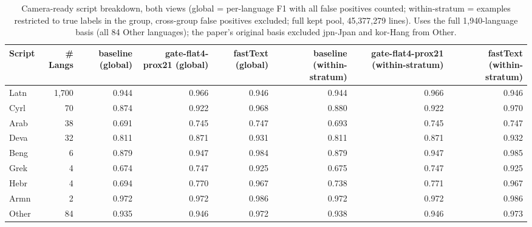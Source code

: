 \begin{table}[htbp]
\centering
\small
\begin{tabular}{lrrrrrrr}
\toprule
\textbf{Script} & \textbf{# Langs} & \textbf{baseline (global)} & \textbf{gate-flat4-prox21 (global)} & \textbf{fastText (global)} & \textbf{baseline (within-stratum)} & \textbf{gate-flat4-prox21 (within-stratum)} & \textbf{fastText (within-stratum)} \\
\midrule
Latn & 1,700 & 0.944 & 0.966 & 0.946 & 0.944 & 0.966 & 0.946 \\
Cyrl & 70 & 0.874 & 0.922 & 0.968 & 0.880 & 0.922 & 0.970 \\
Arab & 38 & 0.691 & 0.745 & 0.747 & 0.693 & 0.745 & 0.747 \\
Deva & 32 & 0.811 & 0.871 & 0.931 & 0.811 & 0.871 & 0.932 \\
Beng & 6 & 0.879 & 0.947 & 0.984 & 0.879 & 0.947 & 0.985 \\
Grek & 4 & 0.674 & 0.747 & 0.925 & 0.675 & 0.747 & 0.925 \\
Hebr & 4 & 0.694 & 0.770 & 0.967 & 0.738 & 0.771 & 0.967 \\
Armn & 2 & 0.972 & 0.972 & 0.986 & 0.972 & 0.972 & 0.986 \\
Other & 84 & 0.935 & 0.946 & 0.972 & 0.938 & 0.946 & 0.973 \\
\bottomrule
\end{tabular}
\caption{Camera-ready script breakdown, both views (global = per-language F1 with all false positives counted; within-stratum = examples restricted to true labels in the group, cross-group false positives excluded; full kept pool, 45,377,279 lines). Uses the full 1,940-language basis (all 84 Other languages); the paper's original basis excluded jpn-Jpan and kor-Hang from Other.}
\label{tab:paper_breakdowns_script}
\end{table}
